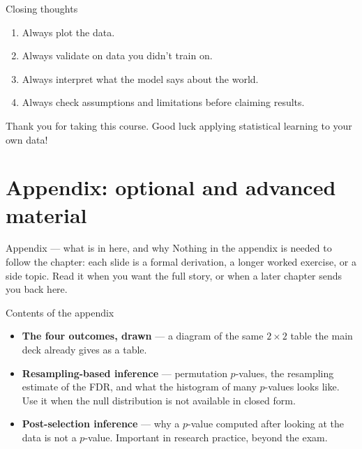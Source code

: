 \documentclass[aspectratio=169,11pt]{beamer}
\begin{document}
\begin{frame}{Closing thoughts}
  \begin{takeaway}
    \begin{enumerate}
      \item Always plot the data.
      \item Always validate on data you didn't train on.
      \item Always interpret what the model says about the world.
      \item Always check assumptions and limitations before claiming
            results.
    \end{enumerate}
  \end{takeaway}
  Thank you for taking this course. Good luck applying statistical
  learning to your own data!
\end{frame}


\appendix
\AtBeginSection[]{}
\section{Appendix: optional and advanced material}

\begin{frame}{Appendix --- what is in here, and why}
  \small
  Nothing in the appendix is needed to follow the chapter: each slide is a
  formal derivation, a longer worked exercise, or a side topic. Read it when
  you want the full story, or when a later chapter sends you back here.
  \begin{block}{Contents of the appendix}
    \begin{itemize}
      \item \textbf{The four outcomes, drawn} --- a diagram of the same $2\times2$ table the main deck already gives as a table.
      \item \textbf{Resampling-based inference} --- permutation $p$-values, the resampling estimate of the FDR, and what the histogram of many $p$-values looks like. Use it when the null distribution is not available in closed form.
      \item \textbf{Post-selection inference} --- why a $p$-value computed after looking at the data is not a $p$-value. Important in research practice, beyond the exam.
    \end{itemize}
  \end{block}
\end{frame}
\end{document}
